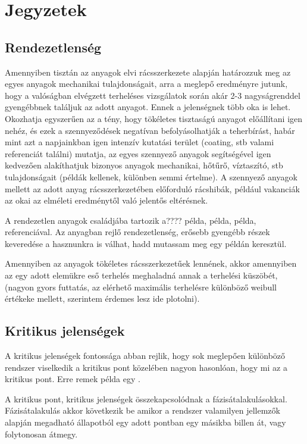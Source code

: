 \chapter{Jegyzetek}

\section{Rendezetlenség}
Amennyiben tisztán az anyagok elvi rácsszerkezete alapján határozzuk meg az egyes anyagok mechanikai tulajdonságait, arra a meglepő eredményre jutunk, hogy a valóságban elvégzett terheléses vizsgálatok során akár 2-3 nagyságrenddel gyengébbnek találjuk az adott anyagot. 
Ennek a jelenségnek több oka is lehet. Okozhatja egyszerűen az a tény, hogy tökéletes tisztaságú anyagot előállítani igen nehéz, és ezek a szennyeződések negatívan befolyásolhatják a teherbírást, habár mint azt a napjainkban igen intenzív kutatási terület (coating, stb valami referenciát találni) mutatja, az egyes szennyező anyagok segítségével igen kedvezően alakíthatjuk bizonyos anyagok mechanikai, hőtűrő, víztaszító, stb tulajdonságait (példák kellenek, különben semmi értelme).
A szennyező anyagok mellett az adott anyag rácsszerkezetében előforduló rácshibák, például vakanciák az okai az elméleti eredménytől való jelentős eltérésnek. 
	
A rendezetlen anyagok családjába tartozik a???? példa, példa, példa, referenciával. Az anyagban rejlő rendezetlenség, erősebb gyengébb részek keveredése a hasznunkra is válhat, hadd mutassam meg egy példán keresztül.

Amennyiben az anyagok tökéletes rácsszerkezetűek lennének, akkor amennyiben az egy adott elemükre eső terhelés meghaladná annak a terhelési küszöbét, (nagyon gyors futtatás, az elérhető maximális terhelésre különböző weibull értékeke mellett, szerintem érdemes lesz ide plotolni).

\section{Kritikus jelenségek}
A kritikus jelenségek fontossága abban rejlik, hogy sok meglepően különböző rendszer viselkedik a kritikus pont közelében nagyon hasonlóan, hogy mi az a kritikus pont. Erre remek példa egy .

A kritikus pont, kritikus jelenségek összekapcsolódnak a fázisátalakulásokkal. Fázisátalakulás akkor következik be amikor a rendszer valamilyen jellemzők alapján megadható állapotból egy adott pontban egy másikba billen át, vagy folytonosan átmegy. 

